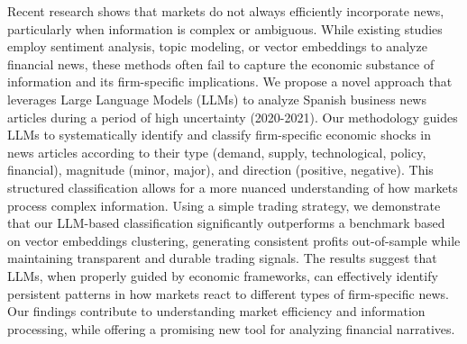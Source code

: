 Recent research shows that markets do not always efficiently incorporate news, particularly when information is complex or ambiguous. While existing studies employ sentiment analysis, topic modeling, or vector embeddings to analyze financial news, these methods often fail to capture the economic substance of information and its firm-specific implications. We propose a novel approach that leverages Large Language Models (LLMs) to analyze Spanish business news articles during a period of high uncertainty (2020-2021). Our methodology guides LLMs to systematically identify and classify firm-specific economic shocks in news articles according to their type (demand, supply, technological, policy, financial), magnitude (minor, major), and direction (positive, negative). This structured classification allows for a more nuanced understanding of how markets process complex information. Using a simple trading strategy, we demonstrate that our LLM-based classification significantly outperforms a benchmark based on vector embeddings clustering, generating consistent profits out-of-sample while maintaining transparent and durable trading signals. The results suggest that LLMs, when properly guided by economic frameworks, can effectively identify persistent patterns in how markets react to different types of firm-specific news. Our findings contribute to understanding market efficiency and information processing, while offering a promising new tool for analyzing financial narratives.


